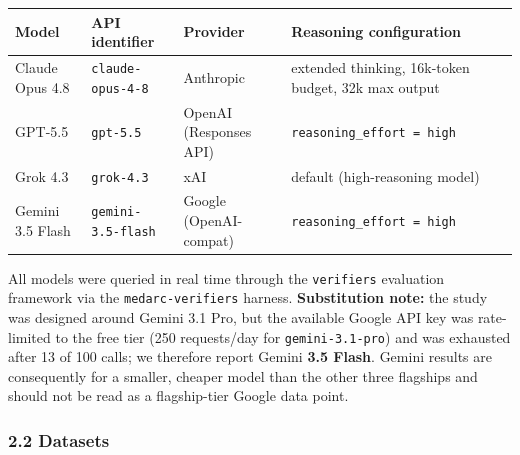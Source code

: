 \documentclass[
  11pt,
]{article}
\newcounter{none} %
\begin{document}
{\def\LTcaptype{none} %
\begin{longtable}[]{@{}
  >{\raggedright\arraybackslash}p{}
  >{\raggedright\arraybackslash}p{}
  >{\raggedright\arraybackslash}p{}
  >{\raggedright\arraybackslash}p{}@{}}
\toprule\noalign{}
\begin{minipage}[b]{\linewidth}\raggedright
Model
\end{minipage} & \begin{minipage}[b]{\linewidth}\raggedright
API identifier
\end{minipage} & \begin{minipage}[b]{\linewidth}\raggedright
Provider
\end{minipage} & \begin{minipage}[b]{\linewidth}\raggedright
Reasoning configuration
\end{minipage} \\
\midrule\noalign{}
\endhead
\bottomrule\noalign{}
\endlastfoot
Claude Opus 4.8 & \texttt{claude-opus-4-8} & Anthropic & extended
thinking, 16k-token budget, 32k max output \\
GPT-5.5 & \texttt{gpt-5.5} & OpenAI (Responses API) &
\texttt{reasoning\_effort\ =\ high} \\
Grok 4.3 & \texttt{grok-4.3} & xAI & default (high-reasoning model) \\
Gemini 3.5 Flash & \texttt{gemini-3.5-flash} & Google (OpenAI-compat) &
\texttt{reasoning\_effort\ =\ high} \\
\end{longtable}
}

All models were queried in real time through the \texttt{verifiers}
evaluation framework via the \texttt{medarc-verifiers} harness.
\textbf{Substitution note:} the study was designed around Gemini 3.1
Pro, but the available Google API key was rate-limited to the free tier
(250 requests/day for \texttt{gemini-3.1-pro}) and was exhausted after
13 of 100 calls; we therefore report Gemini \textbf{3.5 Flash}. Gemini
results are consequently for a smaller, cheaper model than the other
three flagships and should not be read as a flagship-tier Google data
point.

\subsubsection{2.2 Datasets}\label{datasets}
\end{document}
